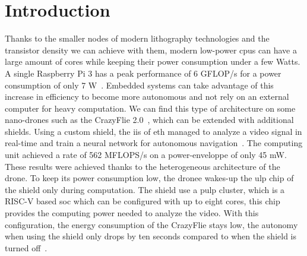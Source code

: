 
\chapter{Introduction}

    Thanks to the smaller nodes of modern lithography technologies and the transistor density we can achieve with them, modern low-power \glspl{cpu} can have a large amount of cores while keeping their power consumption under a few Watts. A single Raspberry Pi 3 has a peak performance of 6 \si{GFLOP/s} for a power consumption of only 7 W~\cite{Art:RpiClusters}.
    Embedded systems can take advantage of this increase in efficiency to become more autonomous and not rely on an external computer for heavy computation. We can find this type of architecture on some nano-drones such as the CrazyFlie 2.0~\cite{Web:CrazyFlie20}, which can be extended with additional shields. Using a custom shield, the \gls{iis} of \acrshort{eth} managed to analyze a video signal in real-time and train a neural network for autonomous navigation~\cite{Art:NanoDrone}. The computing unit achieved a rate of 562 \si{MFLOPS/s} on a power-enveloppe of only 45 \si{mW}.
	These results were achieved thanks to the heterogeneous architecture of the drone.
	To keep its power consumption low, the dronee wakes-up the \gls{ulp} chip of the shield only during computation. 
 	The shield use a \gls{pulp} cluster, which is a RISC-V based \gls{soc} which can be configured with up to eight cores, this chip provides the computing power needed to analyze the video. 
	With this configuration, the energy consumption of the CrazyFlie stays low, the autonomy when using the shield only drops by ten seconds compared to when the shield is turned off~\cite{Art:NanoDrone}.

